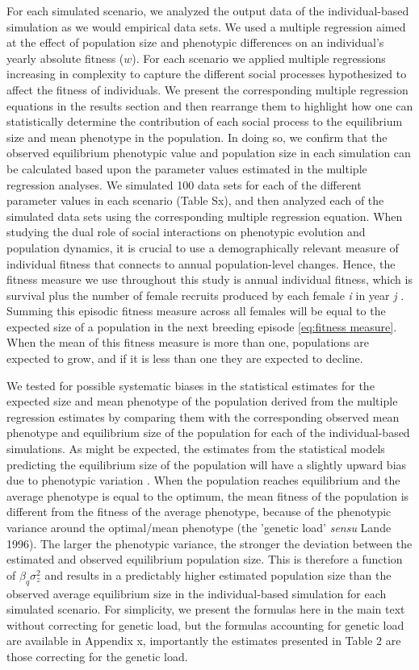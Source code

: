 \documentclass{article}
\begin{document}
For each simulated scenario, we analyzed the output data of the individual-based simulation as we would empirical data sets. We used a multiple regression aimed at the effect of population size and phenotypic differences on an individual's yearly absolute fitness ($w$). For each scenario we applied multiple regressions increasing in complexity to capture the different social processes hypothesized to affect the fitness of individuals. We present the corresponding multiple regression equations in the results section and then rearrange them to highlight how one can statistically determine the contribution of each social process to the equilibrium size and mean phenotype in the population. In doing so, we confirm that the observed equilibrium phenotypic value and population size in each simulation can be calculated based upon the parameter values estimated in the multiple regression analyses. We simulated 100 data sets for each of the different parameter values in each scenario (Table Sx), and then analyzed each of the simulated data sets using the corresponding multiple regression equation. When studying the dual role of social interactions on phenotypic evolution and population dynamics, it is crucial to use a demographically relevant measure of individual fitness that connects to annual population-level changes. Hence, the fitness measure we use throughout this study is annual individual fitness, which is survival plus the number of female recruits produced by each female \textit{i} in year \textit{j} \citep{Saether2015}. Summing this episodic fitness measure across all females will be equal to the expected size of a population in the next breeding episode \ref{eq:fitness measure}. When the mean of this fitness measure is more than one, populations are expected to grow, and if it is less than one they are expected to decline. 

We tested for possible systematic biases in the statistical estimates for the expected size and mean phenotype of the population derived from the multiple regression estimates by comparing them with the corresponding observed mean phenotype and equilibrium size of the population for each of the individual-based simulations. As might be expected, the estimates from the statistical models predicting the equilibrium size of the population will have a slightly upward bias due to phenotypic variation \citep{Lande1996}. When the population reaches equilibrium and the average phenotype is equal to the optimum, the mean fitness of the population is different from the fitness of the average phenotype, because of the phenotypic variance around the optimal/mean phenotype (the 'genetic load' \textit{sensu} Lande 1996). The larger the phenotypic variance, the stronger the deviation between the estimated and observed equilibrium population size. This is therefore a function of $\beta_q \sigma^2_z$ and results in a predictably higher estimated population size than the observed average equilibrium size in the individual-based simulation for each simulated scenario. For simplicity, we present the formulas here in the main text without correcting for genetic load, but the formulas accounting for genetic load are available in Appendix x, importantly the estimates presented in Table 2 are those correcting for the genetic load.   
\end{document}
